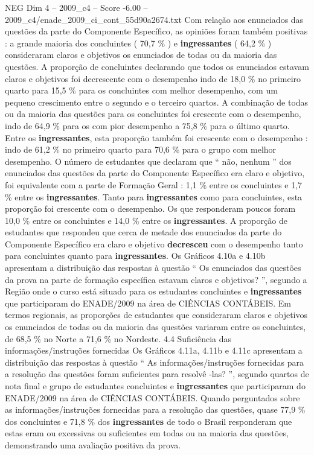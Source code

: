 \begin{textsample}{NEG Dim 4 – 2009\_c4 – Score -6.00 – 2009\_c4/enade\_2009\_ci\_cont\_55d90a2674.txt}
Com relação aos enunciados das questões da parte do Componente Específico, as opiniões foram também positivas : a grande maioria dos concluintes ( 70,7 \% ) e \textbf{ingressantes} ( 64,2 \% ) consideraram claros e objetivos os enunciados de todas ou da maioria das questões.
A proporção de concluintes declarando que todos os enunciados estavam claros e objetivos foi decrescente com o desempenho indo de 18,0 \% no primeiro quarto para 15,5 \% para os concluintes com melhor desempenho, com um pequeno crescimento entre o segundo e o terceiro quartos.
A combinação de todas ou da maioria das questões para os concluintes foi crescente com o desempenho, indo de 64,9 \% para os com pior desempenho a 75,8 \% para o último quarto.
Entre os \textbf{ingressantes}, esta proporção também foi crescente com o desempenho : indo de 61,2 \% no primeiro quarto para 70,6 \% para o grupo com melhor desempenho.
O número de estudantes que declaram que “ não, nenhum ” dos enunciados das questões da parte do Componente Específico era claro e objetivo, foi equivalente com a parte de Formação Geral : 1,1 \% entre os concluintes e 1,7 \% entre os \textbf{ingressantes}.
Tanto para \textbf{ingressantes} como para concluintes, esta proporção foi crescente com o desempenho.
Os que responderam poucos foram 10,0 \% entre os concluintes e 14,0 \% entre os \textbf{ingressantes}.
A proporção de estudantes que respondeu que cerca de metade dos enunciados da parte do Componente Específico era claro e objetivo \textbf{decresceu} com o desempenho tanto para concluintes quanto para \textbf{ingressantes}.
Os Gráficos 4.10a e 4.10b apresentam a distribuição das respostas à questão “ Os enunciados das questões da prova na parte de formação específica estavam claros e objetivos? ”, segundo a Região onde o curso está situado para os estudantes concluintes e \textbf{ingressantes} que participaram do ENADE/2009 na área de CIÊNCIAS CONTÁBEIS.
Em termos regionais, as proporções de estudantes que consideraram claros e objetivos os enunciados de todas ou da maioria das questões variaram entre os concluintes, de 68,5 \% no Norte a 71,6 \% no Nordeste. 4.4 Suficiência das informações/instruções fornecidas Os Gráficos 4.11a, 4.11b e 4.11c apresentam a distribuição das respostas à questão “ As informações/instruções fornecidas para a resolução das questões foram suficientes para resolvê -las? ”, segundo quartos de nota final e grupo de estudantes concluintes e \textbf{ingressantes} que participaram do ENADE/2009 na área de CIÊNCIAS CONTÁBEIS.
Quando perguntados sobre as informações/instruções fornecidas para a resolução das questões, quase 77,9 \% dos concluintes e 71,8 \% dos \textbf{ingressantes} de todo o Brasil responderam que estas eram ou excessivas ou suficientes em todas ou na maioria das questões, demonstrando uma avaliação positiva da prova.

\end{textsample}
